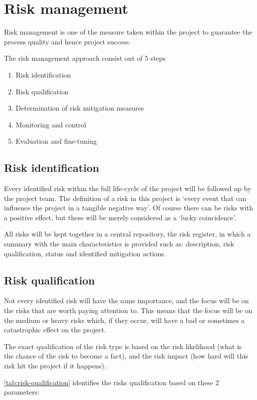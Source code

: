 \section{Risk management}
\label{sec:risk-management}
Risk management is one of the measure taken within the project to guarantee the process quality and hence project success.

The risk management approach consist out of 5 steps

\begin{enumerate}
	\item Risk identification 
	\item Risk qualification
	\item Determination of risk mitigation measures
	\item Monitoring and control
	\item Evaluation and fine-tuning
\end {enumerate}
\subsection{Risk identification}
Every identified risk within the full life-cycle of the project will be followed up by the project team.
The definition of a risk in this project is  `every event that can influence the project in a tangible negative way'.
Of course there can be risks with a positive effect, but these will be merely considered as a `lucky coincidence'.

All risks will be kept together in a central repository, the risk register, in which a summary with the main characteristics is provided such as: description, risk qualification, status and identified mitigation actions.

\subsection{Risk qualification}
Not every identified risk will have the same importance, and the focus will be on the risks that are worth paying attention to.
This means that the focus will be on the medium or heavy risks which, if they occur, will have a bad or sometimes a catastrophic effect on the project.

The exact qualification of the risk type is based on the risk likelihood (what is the chance of the risk to become a fact), and the risk impact (how hard will this risk hit the project if it happens).

\autoref{tab:risk-qualification} identifies the risks qualification based on these 2 parameters:

